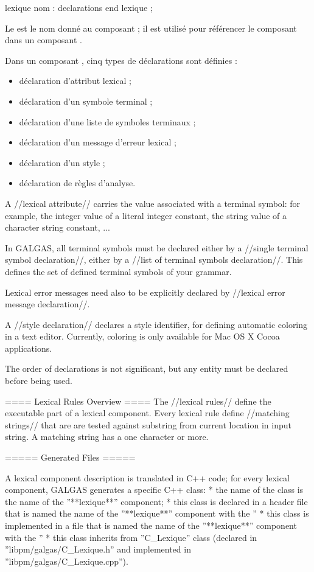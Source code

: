 {
\begin{galgascode}
lexique nom :
  declarations
end lexique ;
\end{galgascode}

Le  est le nom donné au composant ; il est utilisé pour référencer le composant  dans un composant .


Dans un composant , cinq types de déclarations sont définies :
\begin{itemize}
  \item déclaration d'attribut lexical ;
  \item déclaration d'un symbole terminal ;
  \item déclaration d'une liste de symboles terminaux ;
  \item déclaration d'un message d'erreur lexical ;
  \item déclaration d'un style ;
  \item déclaration de règles d'analyse.
\end{itemize}

A //lexical attribute// carries the value associated with a terminal symbol: for example, the integer value of a literal integer constant, the string value of a character string constant, ...

In GALGAS, all terminal symbols must be declared either by a //single terminal symbol declaration//, either by a //list of terminal symbols declaration//. This defines the set of defined terminal symbols of your grammar.

Lexical error messages need also to be explicitly declared by //lexical error message declaration//. 

A //style declaration// declares a style identifier, for defining automatic coloring in a text editor. Currently, coloring is only available for Mac OS X Cocoa applications.

The order of declarations is not significant, but any entity must be declared before being used.

==== Lexical Rules Overview ====
The //lexical rules// define the executable part of a lexical component. Every lexical rule define //matching strings// that are are tested against substring from current location in input string. A matching string has a one character or more.

===== Generated Files =====

A lexical component description is translated in C++ code; for every lexical component, GALGAS generates a specific C++ class:
  * the name of the class is the name of the ''**lexique**'' component;
  * this class is declared in a header file that is named the name of the ''**lexique**'' component with the ''%
  * this class is implemented in a file that is named the name of the ''**lexique**'' component with the ''%
  * this class inherits from ''C\_Lexique'' class (declared in ''libpm/galgas/C\_Lexique.h'' and implemented in ''libpm/galgas/C\_Lexique.cpp'').

}
